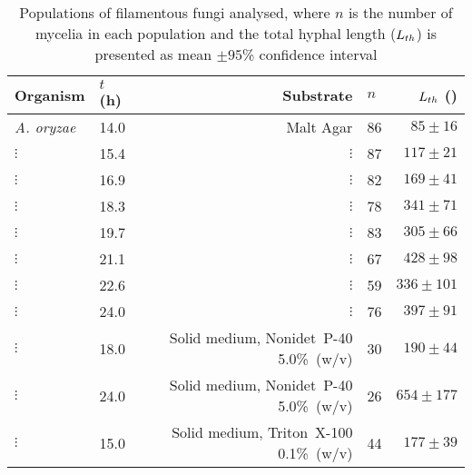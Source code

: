 \begin{table}[htbp]
	\centering
	\footnotesize
	\begin{threeparttable}
	\caption{Populations of filamentous fungi analysed, where $n$ is the number of mycelia in each population and the total hyphal length ($L_{th}$) is presented as mean $\pm 95$\% confidence interval}
	\label{tab:pops}
	\centering
		\begin{tabularx}{(\textwidth - 1cm)}{l l R l r}
			\toprule
			Organism & $t$ (h) & Substrate & $n$ & $L_{th}$ (\omic) \\ \midrule
			\emph{A. oryzae} & 14.0 & Malt Agar & 86 & $85 \pm 16$\\
			\hspace{0.8cm}$\vdots$ & 15.4 & \hspace{0.8cm}$\vdots$ & 87 & $117 \pm 21$\\
			\hspace{0.8cm}$\vdots$ & 16.9 & \hspace{0.8cm}$\vdots$ & 82 & $169 \pm 41$\\
			\hspace{0.8cm}$\vdots$ & 18.3 & \hspace{0.8cm}$\vdots$ & 78 & $341 \pm 71$\\
			\hspace{0.8cm}$\vdots$ & 19.7 & \hspace{0.8cm}$\vdots$ & 83 & $305 \pm 66$\\
			\hspace{0.8cm}$\vdots$ & 21.1 & \hspace{0.8cm}$\vdots$ & 67 & $428 \pm 98$\\
			\hspace{0.8cm}$\vdots$ & 22.6 & \hspace{0.8cm}$\vdots$ & 59 & $336 \pm 101$\\
			\hspace{0.8cm}$\vdots$ & 24.0 & \hspace{0.8cm}$\vdots$ & 76 & $397 \pm 91$\\
			\hspace{0.8cm}$\vdots$ & 18.0 & Solid medium, Nonidet~P-40 5.0\%~(w/v) & 30 & $190 \pm 44$\\
			\hspace{0.8cm}$\vdots$ & 24.0 & Solid medium, Nonidet~P-40 5.0\%~(w/v) & 26 & $654 \pm 177$\\
			\hspace{0.8cm}$\vdots$ & 15.0 & Solid medium, Triton~X-100 0.1\%~(w/v) & 44 & $177 \pm 39$\\

\end{tabularx}
\end{threeparttable}
\end{table}
